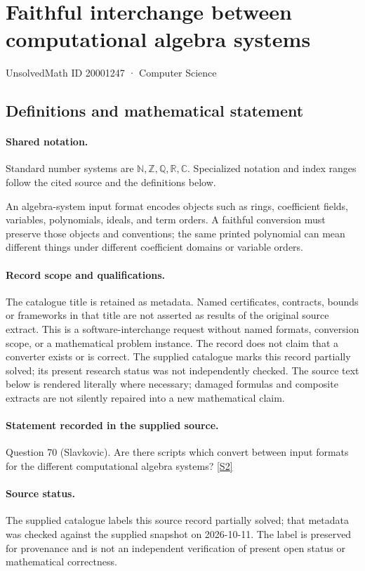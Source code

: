 \documentclass[11pt]{article}
\newcommand{\sref}[2]{\hyperlink{source:#1:#2}{[S#2]}}
\begin{document}
\setcounter{section}{20001246}
\section{Faithful interchange between computational algebra systems}\label{20001247}
{\small\sffamily UnsolvedMath ID 20001247 · Computer Science}
\subsection{Definitions and mathematical statement}

\paragraph{Shared notation.}Standard number systems are $\mathbb N,\mathbb Z,\mathbb Q,\mathbb R,\mathbb C$. Specialized notation and index ranges follow the cited source and the definitions below.


An algebra-system input format encodes objects such as rings, coefficient fields, variables, polynomials, ideals, and term orders. A faithful conversion must preserve those objects and conventions; the same printed polynomial can mean different things under different coefficient domains or variable orders.
\paragraph{Record scope and qualifications.}
The catalogue title is retained as metadata. Named certificates, contracts, bounds or frameworks in that title are not asserted as results of the original source extract.
This is a software-interchange request without named formats, conversion scope, or a mathematical problem instance. The record does not claim that a converter exists or is correct. The supplied catalogue marks this record partially solved; its present research status was not independently checked.
The source text below is rendered literally where necessary; damaged formulas and composite extracts are not silently repaired into a new mathematical claim.
\paragraph{Statement recorded in the supplied source.}
Question 70 (Slavkovic). Are there scripts which convert between input formats for the different computational algebra systems? \sref{20001247}{2}
\paragraph{Source status.}
The supplied catalogue labels this source record partially solved; that metadata was checked against the supplied snapshot on 2026-10-11. The label is preserved for provenance and is not an independent verification of present open status or mathematical correctness.
\end{document}
